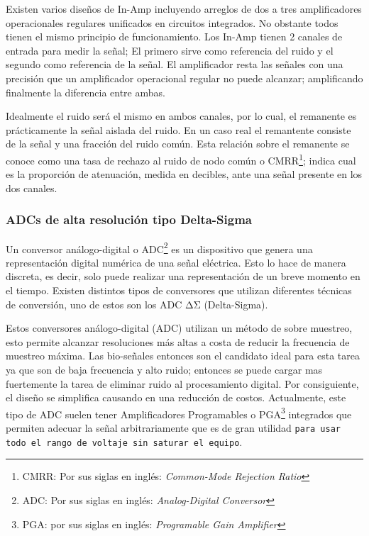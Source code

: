 Existen varios diseños de In-Amp incluyendo arreglos de dos a tres amplificadores operacionales regulares unificados en circuitos integrados. No obstante todos tienen el mismo principio de funcionamiento. Los In-Amp tienen 2 canales de entrada para medir la señal; El primero sirve como referencia del ruido y el segundo como referencia de la señal. El amplificador resta las señales con una precisión que un amplificador operacional regular no puede alcanzar; amplificando finalmente la diferencia entre ambas.

Idealmente el ruido será el mismo en ambos canales, por lo cual, el remanente es prácticamente la señal aislada del ruido. En un caso real el remantente consiste de la señal y una fracción del ruido común. Esta relación sobre el remanente se conoce como una tasa de rechazo al ruido de nodo común o CMRR\footnote{CMRR: Por sus siglas en inglés: \emph{Common-Mode Rejection Ratio}}; indica cual es la proporción de atenuación, medida en decibles, ante una señal presente en los dos canales.

\subsubsection{ADCs de alta resolución tipo Delta-Sigma}
\label{sec:org0d3ecab}
Un conversor análogo-digital o ADC\footnote{ADC: Por sus siglas en inglés: \emph{Analog-Digital Conversor}} es un dispositivo que genera una representación digital numérica de una señal eléctrica. Esto lo hace de manera discreta, es decir, solo puede realizar una representación de un breve momento en el tiempo. Existen distintos tipos de conversores que utilizan diferentes técnicas de conversión, uno de estos son los ADC ΔΣ (Delta-Sigma).

Estos conversores análogo-digital (ADC) utilizan un método de sobre muestreo, esto permite alcanzar resoluciones más altas a costa de reducir la frecuencia de muestreo máxima. Las bio-señales entonces son el candidato ideal para esta tarea ya que son de baja frecuencia y alto ruido; entonces se puede cargar mas fuertemente la tarea de eliminar ruido al procesamiento digital. Por consiguiente, el diseño se simplifica causando en una reducción de costos. Actualmente, este tipo de ADC suelen tener Amplificadores Programables o PGA\footnote{PGA: por sus siglas en inglés: \emph{Programable Gain Amplifier}} integrados que permiten adecuar la señal arbitrariamente que es de gran utilidad \texttt{para usar todo el rango de voltaje sin saturar el equipo}.

